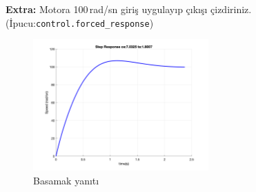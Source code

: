 \noindent\textbf{Extra:} Motora 100\,rad/sn giriş uygulayıp çıkışı çizdiriniz. (İpucu:\verb|control.forced_response|)

\begin{figure}[h]
    \centering
    \includegraphics[width=0.6\textwidth]{motor_step}
    \caption{Basamak yanıtı}
  \end{figure}